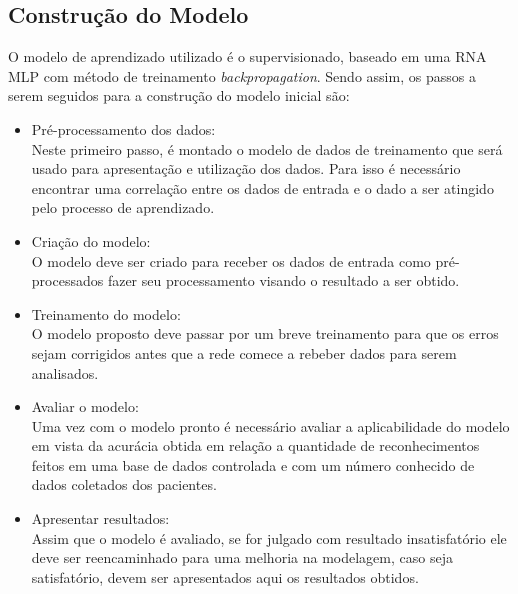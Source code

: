     \subsection{Construção do Modelo}

        O modelo de aprendizado utilizado é o supervisionado, baseado em uma RNA MLP com método de treinamento \textit{backpropagation}.
        Sendo assim, os passos a serem seguidos para a construção do modelo inicial são:

        \begin{itemize}
            \item Pré-processamento dos dados: \\ Neste primeiro passo, é montado o modelo de dados de treinamento que será usado para apresentação e utilização dos dados. Para isso é necessário encontrar uma correlação entre os dados de entrada e o dado a ser atingido pelo processo de aprendizado.

            \item Criação do modelo: \\ O modelo deve ser criado para receber os dados de entrada como pré-processados fazer seu processamento visando o resultado a ser obtido.

            \item Treinamento do modelo: \\ O modelo proposto deve passar por um breve treinamento para que os erros sejam corrigidos antes que a rede comece a rebeber dados para serem analisados.

            \item Avaliar o modelo: \\ Uma vez com o modelo pronto é necessário avaliar a aplicabilidade do modelo em vista da acurácia obtida em relação a quantidade de reconhecimentos feitos em uma base de dados controlada e com um número conhecido de dados coletados dos pacientes.

            \item Apresentar resultados: \\ Assim que o modelo é avaliado, se for julgado com resultado insatisfatório ele deve ser reencaminhado para uma melhoria na modelagem, caso seja satisfatório, devem ser apresentados aqui os resultados obtidos.
        \end{itemize}
